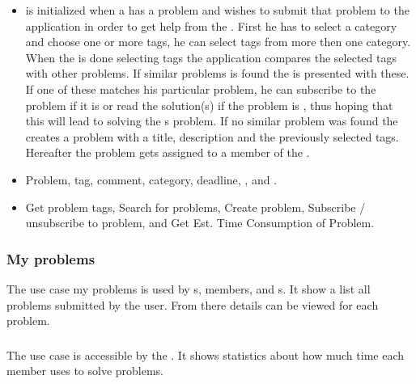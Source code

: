 \begin{itemize}
\item {} \ucsproblem[c] is initialized when a \aclient{} has a problem and wishes to submit that problem to the application in order to get help from the \astaff{}. 
First he has to select a category and choose one or more tags, he can select tags from more then one category. 
When the \aclient{} is done selecting tags the application compares the selected tags with other problems. 
If similar problems is found the \aclient{} is presented with these.
If one of these matches his particular problem, he can subscribe to the problem if it is \open[] or read the solution(s) if the problem is \closed{}, thus hoping that this will lead to solving the \aclient[]s problem.
If no similar problem was found the \aclient{} creates a problem with a title, description and the previously selected tags. 
Hereafter the problem gets assigned to a member of the \astaff{}. 

\item {} Problem, tag, comment, category, deadline, \client[], and \staff[].

\item {} Get problem tags, Search for problems, Create problem, Subscribe / unsubscribe to problem, and Get Est. Time Consumption of Problem. 
\end{itemize}



\subsubsection{My problems} The use case my problems is used by  \aclient[]s, \astaff[] members, and \admin[]s. It show a list all problems submitted by the user. From there details can be viewed for each problem. 


\subsubsection{\gstat[c]} The use case \gstat[] is accessible by the \admin[]. It shows statistics about how much time each \astaff[] member uses to solve problems.

